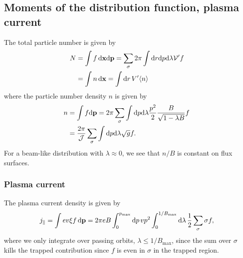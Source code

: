 \documentclass[11pt,a4paper]{article}
\newcommand{\rd}{\ensuremath{\mathrm{d}}}
\newcommand{\sub}[1]{\ensuremath{_{\text{#1}}}}
\renewcommand{\b}[1]{\ensuremath{ {\bf #1 } }}
\begin{document}
\subsection{Moments of the distribution function, plasma current}
The total particle number is given by 
\begin{align}
N &= \int f \, \rd \b{x} \rd \b{p}  = \sum_\sigma 2\pi\int \rd r \rd p \rd \lambda \mathcal{V}' f \nonumber \\
&= \int n \,\rd\b{x} = \int \rd r \, V' \langle n \rangle
\end{align}
where the particle number density $n$ is given by
\begin{align}
n &= \int f \rd \b{p} = 2\pi \sum_\sigma \int \rd p \rd\lambda \frac{p^2}{2}\frac{B}{\sqrt{1-\lambda B}} f \nonumber \\
&=\frac{2\pi}{\mathcal{J}} \sum_\sigma \int \rd p \rd\lambda \sqrt{g}f.
\end{align}
For a beam-like distribution with $\lambda \approx 0$, we see that $n/B$ is constant on flux surfaces.

\subsubsection*{Plasma current}
The plasma current density is given by
\begin{align}
j_\parallel = \int ev \xi f \,\rd\b{p} = 2\pi eB\int_0^{p\sub{max}} \rd p \, vp^2 \int_0^{1/B\sub{max}} \rd \lambda \, \frac{1}{2}\sum_\sigma  \sigma f,
\end{align}
where we only integrate over passing orbits, $\lambda \leq 1/B\sub{max}$, since the sum over $\sigma$ kills the trapped contribution since $f$ is even in $\sigma$ in the trapped region.
\end{document}
